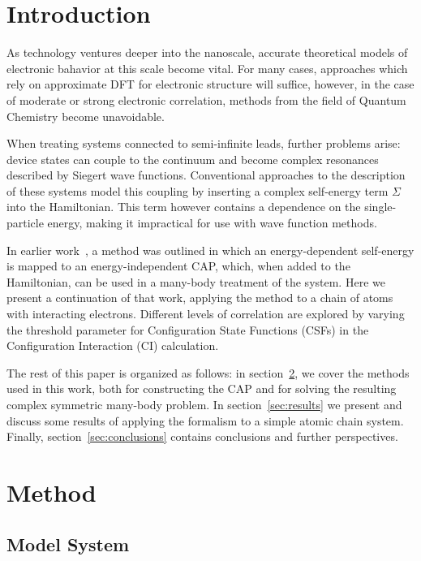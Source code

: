 \section{Introduction}

As technology ventures deeper into the nanoscale, accurate theoretical models
of electronic bahavior at this scale become vital. For many cases, approaches
which rely on approximate DFT for electronic structure will suffice, however,
in the case of moderate or strong electronic correlation, methods from the
field of Quantum Chemistry become unavoidable.

When treating systems connected to semi-infinite leads, further problems arise:
device states can couple to the continuum and become complex resonances
described by Siegert wave functions. Conventional approaches to the description
of these systems model this coupling by inserting a complex self-energy term
$\Sigma$ into the Hamiltonian. This term however contains a dependence on the
single-particle energy, making it impractical for use with wave function
methods.

In earlier work~\cite{henderson}, a method was outlined in which an
energy-dependent self-energy is mapped to an energy-independent
\ac{CAP}, which, when added to the Hamiltonian, can be used
in a many-body treatment of the system. Here we present a continuation of that
work, applying the method to a chain of atoms with interacting electrons.
Different levels of correlation are explored by varying the threshold
parameter for Configuration State Functions (CSFs) in the Configuration
Interaction (CI) calculation.

The rest of this paper is organized as follows: in section~\ref{sec:method}, we
cover the methods used in this work, both for constructing the CAP and for
solving the resulting complex symmetric many-body problem. In
section~\ref{sec:results} we present and discuss some results of applying the
formalism to a simple atomic chain system. Finally,
section~\ref{sec:conclusions} contains conclusions and further perspectives.


\section{Method}
\label{sec:method}

\subsection{Model System}
\label{subsec:modelsystem}

